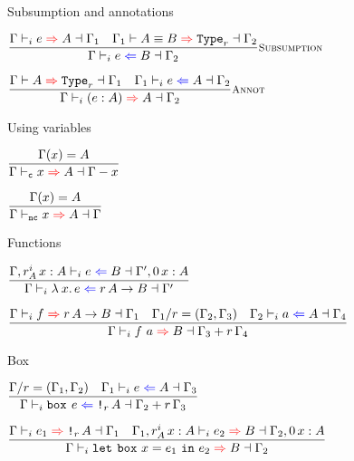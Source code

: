 \begin{frame}{Subsumption and annotations}

\begin{center}
  $\infrule[Subsumption]{\infertype{\Gamma}{e}{A}{\Gamma_1} \quad \infertypeconv{\Gamma_1}{A}{B}[r]{\Gamma_2}}{\checktype{\Gamma}{e}{B}{\Gamma_2}}$

  \vspace{2em}

  $\infrule[Annot]{\inferkind{\Gamma}{A}[r]{\Gamma_1} \quad \checktype{\Gamma_1}{e}{A}{\Gamma_2}}{\infertype{\Gamma}{\annot{e}{A}}{A}{\Gamma_2}}$
\end{center}

\end{frame}

\begin{frame}{Using variables}

\begin{center}
  $\infrule{\findvar{\Gamma}{x}{A}}{\infertype{\Gamma}[\computable]{x}{A}{\usevar{\Gamma}{x}}}$

  \vspace{2em}

  $\infrule{\findvar{\Gamma}{x}{A}}{\infertype{\Gamma}[\noncomputable]{x}{A}{\Gamma}}$
\end{center}

\end{frame}

\begin{frame}{Functions}

\begin{center}
  $\infrule{\checktype{\extend{\Gamma}[\totalqty{r}{A}]{x}{A}}{e}{B}{\extend{\Gamma'}[\Zero]{x}{A}}}{\checktype{\Gamma}{\fun{x}{e}}{\Fun[r]{A}{B}}{\Gamma'}}$

  \vspace{2em}

  $\infrule{\infertype{\Gamma}{f}{\Fun[r]{A}{B}}{\Gamma_1} \quad \divctx{\Gamma_1}{r} = (\Gamma_2, \Gamma_3) \quad \checktype{\Gamma_2}{a}{A}{\Gamma_4}}{\infertype{\Gamma}{\app{f}{a}}{B}{\addctx{\Gamma_3}{\scalectx{r}{\Gamma_4}}}}$
\end{center}

\end{frame}

\begin{frame}{Box}

\begin{center}
  $\infrule{\divctx{\Gamma}{r} = (\Gamma_1, \Gamma_2) \quad \checktype{\Gamma_1}{e}{A}{\Gamma_3}}{\checktype{\Gamma}{\boxintro{e}}{\Box[r]{A}}{\addctx{\Gamma_2}{\scalectx{r}{\Gamma_3}}}}$

  \vspace{2em}

  $\infrule{\infertype{\Gamma}{e_1}{\Box[r]{A}}{\Gamma_1} \quad \infertype{\extend{\Gamma_1}[\totalqty{r}{A}]{x}{A}}{e_2}{B}{\extend{\Gamma_2}[\Zero]{x}{A}}}{\infertype{\Gamma}{\boxelim{x}{e_1}{e_2}}{B}{\Gamma_2}}$
\end{center}

\end{frame}


